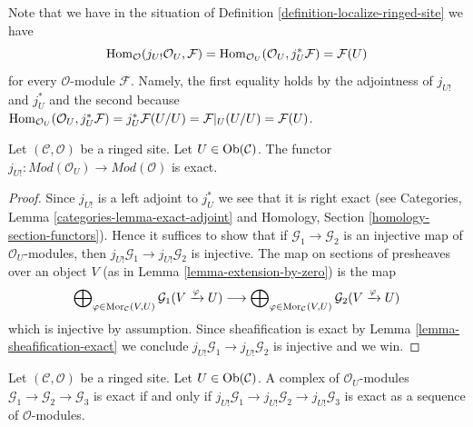 \noindent
Note that we have in the situation of
Definition \ref{definition-localize-ringed-site} we have
\begin{equation}
\label{equation-map-lower-shriek-OU-into-module}
\mathop{\mathrm{Hom}}\nolimits_\mathcal{O}(j_{U!}\mathcal{O}_U, \mathcal{F}) =
\mathop{\mathrm{Hom}}\nolimits_{\mathcal{O}_U}(\mathcal{O}_U, j_U^*\mathcal{F}) =
\mathcal{F}(U)
\end{equation}
for every $\mathcal{O}$-module $\mathcal{F}$. Namely, the first equality
holds by the adjointness of $j_{U!}$ and $j_U^*$ and the second because
$\mathop{\mathrm{Hom}}\nolimits_{\mathcal{O}_U}(\mathcal{O}_U, j_U^*\mathcal{F}) =
j_U^*\mathcal{F}(U/U) = \mathcal{F}|_U(U/U) = \mathcal{F}(U)$.

\begin{lemma}
\label{lemma-extension-by-zero-exact}
Let $(\mathcal{C}, \mathcal{O})$ be a ringed site.
Let $U \in \mathop{\mathrm{Ob}}\nolimits(\mathcal{C})$.
The functor
$j_{U!} : \textit{Mod}(\mathcal{O}_U) \to \textit{Mod}(\mathcal{O})$
is exact.
\end{lemma}

\begin{proof}
Since $j_{U!}$ is a left adjoint to $j_U^*$ we see that it is right exact
(see
Categories, Lemma \ref{categories-lemma-exact-adjoint}
and
Homology, Section \ref{homology-section-functors}).
Hence it suffices to show that if $\mathcal{G}_1 \to \mathcal{G}_2$
is an injective map of $\mathcal{O}_U$-modules, then
$j_{U!}\mathcal{G}_1 \to j_{U!}\mathcal{G}_2$ is injective.
The map on sections of presheaves over an object $V$
(as in Lemma \ref{lemma-extension-by-zero}) is the map
$$
\bigoplus\nolimits_{\varphi \in \mathop{\mathrm{Mor}}\nolimits_\mathcal{C}(V, U)}
\mathcal{G}_1(V \xrightarrow{\varphi} U)
\longrightarrow
\bigoplus\nolimits_{\varphi \in \mathop{\mathrm{Mor}}\nolimits_\mathcal{C}(V, U)}
\mathcal{G}_2(V \xrightarrow{\varphi} U)
$$
which is injective by assumption. Since sheafification is exact by
Lemma \ref{lemma-sheafification-exact}
we conclude $j_{U!}\mathcal{G}_1 \to j_{U!}\mathcal{G}_2$ is injective and
we win.
\end{proof}

\begin{lemma}
\label{lemma-j-shriek-reflects-exactness}
Let $(\mathcal{C}, \mathcal{O})$ be a ringed site.
Let $U \in \mathop{\mathrm{Ob}}\nolimits(\mathcal{C})$. A complex of $\mathcal{O}_U$-modules
$\mathcal{G}_1 \to \mathcal{G}_2 \to \mathcal{G}_3$ is exact
if and only if
$j_{U!}\mathcal{G}_1 \to j_{U!}\mathcal{G}_2 \to j_{U!}\mathcal{G}_3$
is exact as a sequence of $\mathcal{O}$-modules.
\end{lemma}

